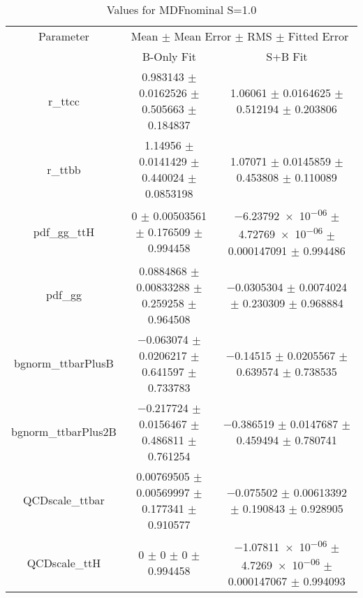 \begin{table}
\centering
\caption{Values for MDFnominal S=1.0}
\begin{tabular}{ccc}
\toprule
Parameter & \multicolumn{2}{c}{Mean $\pm$ Mean Error $\pm$ RMS $\pm$ Fitted Error}\\
 & B-Only Fit & S+B Fit\\
\midrule
r\_ttcc & \num{0.983143} $\pm$ \num{0.0162526} $\pm$ \num{0.505663} $\pm$ \num{0.184837} & \num{1.06061} $\pm$ \num{0.0164625} $\pm$ \num{0.512194} $\pm$ \num{0.203806}\\
r\_ttbb & \num{1.14956} $\pm$ \num{0.0141429} $\pm$ \num{0.440024} $\pm$ \num{0.0853198} & \num{1.07071} $\pm$ \num{0.0145859} $\pm$ \num{0.453808} $\pm$ \num{0.110089}\\
pdf\_gg\_ttH & \num{0} $\pm$ \num{0.00503561} $\pm$ \num{0.176509} $\pm$ \num{0.994458} & \num{-6.23792e-06} $\pm$ \num{4.72769e-06} $\pm$ \num{0.000147091} $\pm$ \num{0.994486}\\
pdf\_gg & \num{0.0884868} $\pm$ \num{0.00833288} $\pm$ \num{0.259258} $\pm$ \num{0.964508} & \num{-0.0305304} $\pm$ \num{0.0074024} $\pm$ \num{0.230309} $\pm$ \num{0.968884}\\
bgnorm\_ttbarPlusB & \num{-0.063074} $\pm$ \num{0.0206217} $\pm$ \num{0.641597} $\pm$ \num{0.733783} & \num{-0.14515} $\pm$ \num{0.0205567} $\pm$ \num{0.639574} $\pm$ \num{0.738535}\\
bgnorm\_ttbarPlus2B & \num{-0.217724} $\pm$ \num{0.0156467} $\pm$ \num{0.486811} $\pm$ \num{0.761254} & \num{-0.386519} $\pm$ \num{0.0147687} $\pm$ \num{0.459494} $\pm$ \num{0.780741}\\
QCDscale\_ttbar & \num{0.00769505} $\pm$ \num{0.00569997} $\pm$ \num{0.177341} $\pm$ \num{0.910577} & \num{-0.075502} $\pm$ \num{0.00613392} $\pm$ \num{0.190843} $\pm$ \num{0.928905}\\
QCDscale\_ttH & \num{0} $\pm$ \num{0} $\pm$ \num{0} $\pm$ \num{0.994458} & \num{-1.07811e-06} $\pm$ \num{4.7269e-06} $\pm$ \num{0.000147067} $\pm$ \num{0.994093}\\
\bottomrule
\end{tabular}
\end{table}